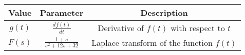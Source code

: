 
\begin{tabular}{|c|c|c|}
\hline
\textbf{Value} & \textbf{Parameter} & \textbf{Description} \\
\hline
$g(t)$ & $\frac{df(t)}{dt}$ & Derivative of $f(t)$ with respect to $t$ \\
\hline
$F(s)$ & $\frac{1+s}{s^2+12s+32}$ & Laplace transform of the function $f(t)$ \\
\hline

\end{tabular}


